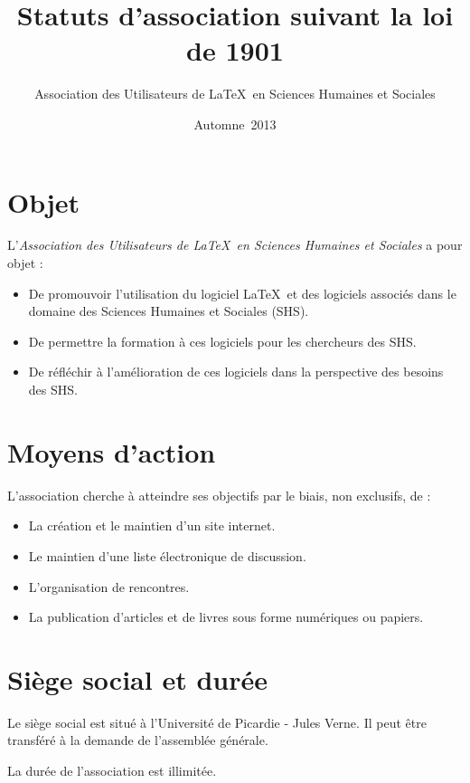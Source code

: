 \documentclass[11pt]{article}
\begin{document}
\title{Statuts d'association suivant la loi de 1901}
\author{Association des Utilisateurs de \LaTeX\ en Sciences Humaines et Sociales}
\date{Automne~2013}
\maketitle


\section{Objet}

L'\emph{Association des Utilisateurs de \LaTeX\ en Sciences Humaines et Sociales} a pour objet :
\begin{itemize}
	\item De promouvoir l'utilisation du logiciel \LaTeX\ et des logiciels associés dans le domaine des Sciences Humaines et Sociales (SHS).
	\item De permettre la formation à ces logiciels pour les chercheurs des SHS.
	\item De réfléchir à l'amélioration de ces logiciels dans la perspective des besoins des SHS.
\end{itemize} 

\section{Moyens d'action}

L'association cherche à atteindre ses objectifs par le biais, non exclusifs, de :
\begin{itemize}
	\item La création et le maintien d'un site internet.
	\item Le maintien d'une liste électronique de discussion.
	\item L'organisation de rencontres.
	\item La publication d'articles et de livres sous forme numériques ou papiers.
\end{itemize} 

\section{Siège social et durée}

Le siège social est situé à l'Université de Picardie - Jules Verne. Il peut être transféré à la demande de l'assemblée générale.

La durée de l'association est illimitée.
\end{document}
